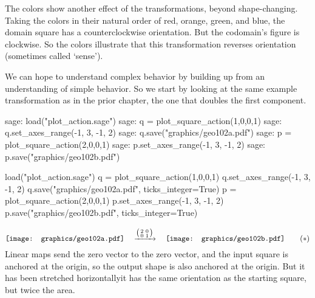 The colors show another effect of the transformations, beyond shape-changing.
Taking the colors in their natural order of red, orange, 
green, and blue,
the domain square has a counterclockwise orientation. 
But the codomain's figure is clockwise. 
So the colors illustrate that this transformation 
reverses orientation (sometimes called `sense').

We can hope to understand complex behavior by 
building up from an understanding of simple behavior.
So we start by looking at the same example transformation as in the prior chapter,
the one that doubles the first component.
\begin{sagecommandline}
sage: load("plot_action.sage")
sage: q = plot_square_action(1,0,0,1) 
sage: q.set_axes_range(-1, 3, -1, 2) 
sage: q.save("graphics/geo102a.pdf")
sage: p = plot_square_action(2,0,0,1)  
sage: p.set_axes_range(-1, 3, -1, 2) 
sage: p.save("graphics/geo102b.pdf")
\end{sagecommandline}
\begin{sagesilent}
load("plot_action.sage")
q = plot_square_action(1,0,0,1) 
q.set_axes_range(-1, 3, -1, 2) 
q.save("graphics/geo102a.pdf", ticks_integer=True)
p = plot_square_action(2,0,0,1)  
p.set_axes_range(-1, 3, -1, 2) 
p.save("graphics/geo102b.pdf", ticks_integer=True)
\end{sagesilent}
\begin{equation*}
  \vcenteredhbox{\texttt{[image: graphics/geo102a.pdf]}}
  \quad\mapsvia{\big (\begin{smallmatrix} 2 &0 \\ 0 &1 \end{smallmatrix}\big )}\quad
  \vcenteredhbox{\texttt{[image: graphics/geo102b.pdf]}}
  \tag{$*$}
\end{equation*}
Linear maps send the zero vector to the zero vector, and the input
square is anchored at the origin, so 
the output shape is also anchored at the origin.
But it has been stretched horizontally\Dash it has the same orientation
as the starting square, but twice the area.

